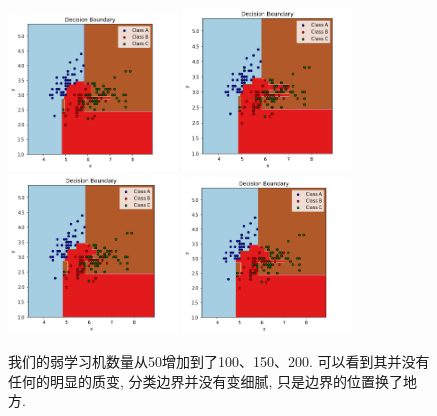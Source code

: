 \documentclass[lang=cn,11pt]{elegantpaper}
\begin{document}

\begin{figure}[htbp]
  \centering
    \includegraphics[width=0.4\textwidth]{adat50}
    \includegraphics[width=0.4\textwidth]{adat100}\\
    \includegraphics[width=0.4\textwidth]{adat150}
    \includegraphics[width=0.4\textwidth]{adat200}
    \caption{我们的弱学习机数量从50增加到了100、150、200. 可以看到其并没有任何的明显的质变, 分类边界并没有变细腻, 只是边界的位置换了地方.}
  \end{figure}
\end{document}

